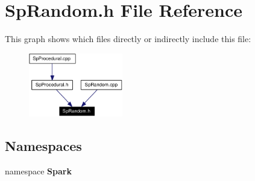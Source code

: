 \section{Sp\-Random.h File Reference}
\label{SpRandom_8h}


This graph shows which files directly or indirectly include this file:\begin{figure}[H]
\begin{center}
\leavevmode
\includegraphics[width=116pt]{SpRandom_8h__dep__incl}
\end{center}
\end{figure}
\subsection*{Namespaces}
\begin{CompactItemize}
\item 
namespace {\bf Spark}
\end{CompactItemize}
